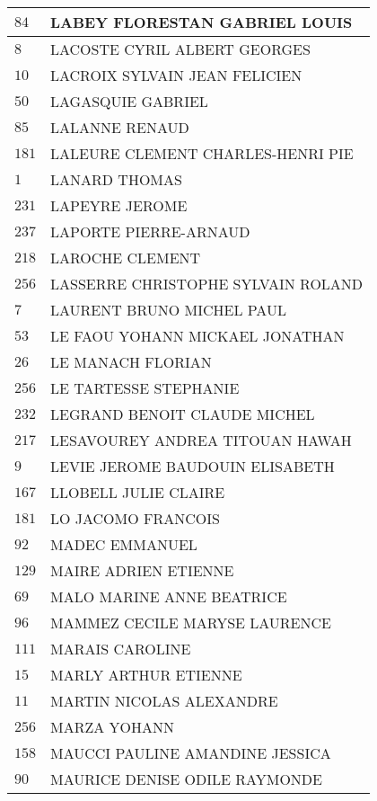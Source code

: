 \begin{xltabular}{\linewidth}{|l|X|}
    \hline
    $84$ & LABEY FLORESTAN GABRIEL LOUIS \\
    \hline
    $8$ & LACOSTE CYRIL ALBERT GEORGES \\
    \hline
    $10$ & LACROIX SYLVAIN JEAN FELICIEN \\
    \hline
    $50$ & LAGASQUIE GABRIEL \\
    \hline
    $85$ & LALANNE RENAUD \\
    \hline
    $181$ & LALEURE CLEMENT CHARLES-HENRI PIE \\
    \hline
    $1$ & LANARD THOMAS \\
    \hline
    $231$ & LAPEYRE JEROME \\
    \hline
    $237$ & LAPORTE PIERRE-ARNAUD \\
    \hline
    $218$ & LAROCHE CLEMENT \\
    \hline
    $256$ & LASSERRE CHRISTOPHE SYLVAIN ROLAND \\
    \hline
    $7$ & LAURENT BRUNO MICHEL PAUL \\
    \hline
    $53$ & LE FAOU YOHANN MICKAEL JONATHAN \\
    \hline
    $26$ & LE MANACH FLORIAN \\
    \hline
    $256$ & LE TARTESSE STEPHANIE \\
    \hline
    $232$ & LEGRAND BENOIT CLAUDE MICHEL \\
    \hline
    $217$ & LESAVOUREY ANDREA TITOUAN HAWAH \\
    \hline
    $9$ & LEVIE JEROME BAUDOUIN ELISABETH \\
    \hline
    $167$ & LLOBELL JULIE CLAIRE \\
    \hline
    $181$ & LO JACOMO FRANCOIS \\
    \hline
    $92$ & MADEC EMMANUEL \\
    \hline
    $129$ & MAIRE ADRIEN ETIENNE \\
    \hline
    $69$ & MALO MARINE ANNE BEATRICE \\
    \hline
    $96$ & MAMMEZ CECILE MARYSE LAURENCE \\
    \hline
    $111$ & MARAIS CAROLINE \\
    \hline
    $15$ & MARLY ARTHUR ETIENNE \\
    \hline
    $11$ & MARTIN NICOLAS ALEXANDRE \\
    \hline
    $256$ & MARZA YOHANN \\
    \hline
    $158$ & MAUCCI PAULINE AMANDINE JESSICA \\
    \hline
    $90$ & MAURICE DENISE ODILE RAYMONDE \\

\end{xltabular}
